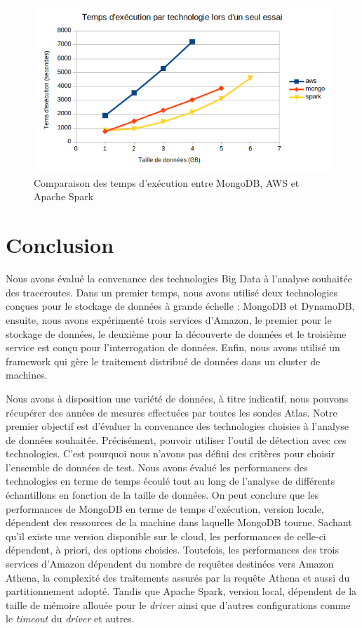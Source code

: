 \begin{figure}[H]
	\centering
	\includegraphics[width=0.7\linewidth]{illustrations/mondb-vs-spark-vs-athena}
	\caption{Comparaison des temps d'exécution entre MongoDB, AWS et Apache Spark}
	\label{fig:mondb-vs-spark-vs-athena}
\end{figure}


\section{Conclusion}

Nous avons évalué la convenance des technologies Big Data  à l'analyse souhaitée des traceroutes. Dans un premier temps, nous avons utilisé deux technologies conçues pour le stockage de données à grande échelle : MongoDB et DynamoDB, ensuite, nous avons expérimenté trois services d'Amazon, le premier pour le stockage de données, le deuxième  pour la découverte de données et le troisième service  est conçu pour l'interrogation  de données. Enfin, nous avons utilisé un framework qui gère le traitement distribué de données dans un cluster de machines.

Nous avons à disposition une variété de données,   à titre indicatif, nous pouvons récupérer des années  de mesures effectuées par toutes les sondes Atlas. Notre premier objectif  est d'évaluer la convenance des technologies choisies à l'analyse de données souhaitée. Précisément, pouvoir utiliser l'outil de détection avec ces technologies. C'est pourquoi nous n'avons pas défini des critères pour choisir l'ensemble de données de test. 
Nous avons évalué  les performances des technologies en terme de temps écoulé tout au long de l'analyse de différents échantillons en fonction de la taille de données. On peut conclure que les performances de MongoDB en terme de temps d'exécution, version locale, dépendent des ressources de la machine dans laquelle MongoDB tourne. Sachant qu'il existe une version disponible sur le cloud, les performances de celle-ci dépendent, à priori,  des options choisies.
Toutefois, les performances des trois services d'Amazon dépendent du nombre de requêtes destinées vers Amazon Athena, la complexité des traitements assurés par la requête Athena et aussi du partitionnement adopté. 
Tandis que Apache Spark, version local,  dépendent de la taille de  mémoire allouée pour le \textit{driver} ainsi que d'autres configurations comme le \textit{timeout} du \textit{driver} et  autres. 


